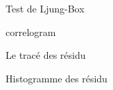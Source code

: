	\begin{figure}[H]
		\centering
		\caption{Test de Ljung-Box}
		\label{fig:Q-test}
	\end{figure}
	
	\begin{figure}[H]
		\centering
		\caption{correlogram}
		\label{fig:correlogram}
	\end{figure}
	

\begin{figure}[H]
		\centering
		\caption{Le tracé des résidu}
		\label{fig:plot-resi}
	\end{figure}
	
	\begin{figure}[H]
		\centering
		\caption{Histogramme des résidu}
		\label{fig:hist-resi}
	\end{figure}
	
	